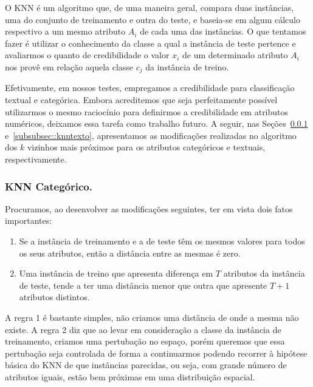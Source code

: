 O \textsc{KNN} é um algoritmo que, de uma maneira geral, compara duas instâncias, uma do conjunto de treinamento e outra do teste, e baseia-se em algum cálculo respectivo a um mesmo atributo $A_i$ de cada uma das instâncias. O que tentamos fazer é utilizar o conhecimento da classe a qual a instância de teste pertence e avaliarmos o quanto de credibilidade o valor $x_i$ de um determinado atributo $A_i$ nos provê em relação aquela classe $c_j$ da instância de treino.

Efetivamente, em nossos testes, empregamos a credibilidade para classificação textual e categórica. Embora acreditemos que seja perfeitamente possível utilizarmos o mesmo raciocínio para definirmos a credibilidade em atributos numéricos, deixamos essa tarefa como trabalho futuro. A seguir, nas Seções~\ref{subsubsec::knncat} e~\ref{subsubsec::knntexto}, apresentamos as modificações realizadas no algoritmo dos $k$ vizinhos mais próximos para os atributos categóricos e textuais, respectivamente.

\subsubsection{\textsc{KNN} Categórico.}
\label{subsubsec::knncat}

Procuramos, ao desenvolver as modificações seguintes, ter em vista dois fatos importantes:
\begin{enumerate}
\item Se a instância de treinamento e a de teste têm os mesmos valores para todos os seus atributos, então a distância entre as mesmas é zero. 
\item Uma instância de treino que apresenta diferença em $T$ atributos da instância de teste, tende a ter uma distância menor que outra que apresente $T+1$ atributos distintos.
\end{enumerate}

A regra 1 é bastante simples, não criamos uma distância de onde a mesma não existe. A regra 2 diz que ao levar em consideração a classe da instância de treinamento, criamos uma pertubação no espaço, porém queremos que essa pertubação seja controlada de forma a continuarmos podendo recorrer à hipótese básica do \textsc{KNN} de que instâncias parecidas, ou seja, com grande número de atributos iguais, estão bem próximas em uma distribuição espacial.

